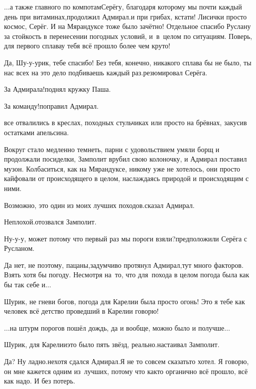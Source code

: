 \diagdash $\ldots$а также главного по компотам\mdash Серёгу, благодаря которому мы почти каждый день при витаминах,\mdash продолжил Адмирал.\mdash и при грибах, кстати! Лисички просто космос, Серёг. И на Мярандуксе тоже было зачётно! Отдельное спасибо Руслану за стойкость в перенесении погодных условий, и~в~целом по ситуациям. Поверь, для первого сплава\mdash у тебя всё прошло более чем круто! 

\diagdash Да, Шу-у-урик, тебе спасибо! Без тебя, конечно, никакого сплава бы не было, ты нас всех на это дело подбиваешь каждый раз.\mdash резюмировал Серёга.

\diagdash За Адмирала!\mdash поднял кружку Паша.

\diagdash За команду!\mdash поправил Адмирал.

\mdash все отвалились в креслах, походных стульчиках или просто на брёвнах, закусив остатками апельсина.

Вокруг стало медленно темнеть, парни с удовольствием умяли борщ и продолжали посиделки, Замполит врубил свою колоночку, и Адмирал поставил музон. Колбаситься, как на Мярандуксе, никому уже не хотелось, они просто кайфовали от происходящего в целом, наслаждаясь природой и происходящим с ними.

\diagdash Возможно, это один из моих лучших походов.\mdash сказал Адмирал.

\diagdash Неплохой.\mdash отозвался Замполит.

\diagdash Ну-у-у, может потому что первый раз мы пороги взяли?\mdash предположили Серёга с Русланом.

\diagdash Да нет, не поэтому, пацаны,\mdash задумчиво протянул Адмирал,\mdash тут много факторов. Взять хотя бы погоду. Несмотря на~то, что для~похода в целом погода была как бы так себе и$\ldots$

\diagdash Шурик, не гневи богов, погода для Карелии была просто огонь! Это я тебе как человек всё детство проведший в Карелии говорю!

\diagdash $\ldots$на штурм порогов пошёл дождь, да и вообще, можно было и получше$\ldots$

\diagdash Шурик, для Карелии\mdash это было пять звёзд, реально.\mdash настаивал Замполит.

\diagdash Да? Ну ладно.\mdash нехотя сдался Адмирал.\mdash Я не то совсем сказать\sdash то хотел. Я говорю, он мне кажется одним из~лучших, потому что как\sdash то органично всё прошло, всё как надо. И без потерь.

